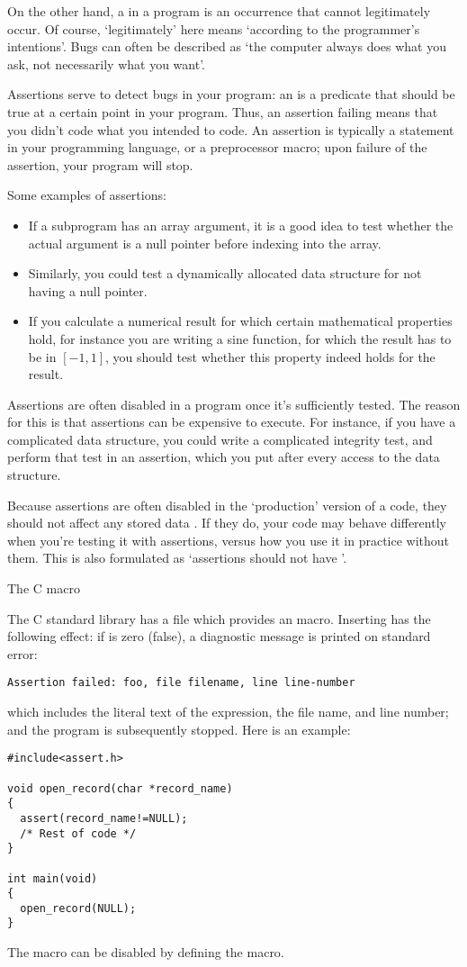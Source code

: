 On the other hand, a  in a program is an occurrence that cannot
legitimately occur. Of course, `legitimately' here means `according to
the programmer's intentions'. Bugs can often be described as `the computer
always does what you ask, not necessarily what you want'.

Assertions serve to detect bugs in your program: an 
is a predicate that should be true at a certain point in your program.
Thus, an assertion failing means that you didn't code what you intended to code.
An assertion is typically a statement in your programming language,
or a preprocessor macro; upon failure of the assertion, your program
will stop.

Some examples of assertions:
\begin{itemize}
\item If a subprogram has an array argument, it is a good idea to
  test whether the actual argument is a null pointer before indexing
  into the array.
\item Similarly, you could test a dynamically allocated data structure
  for not having a null pointer.
\item If you calculate a numerical result for which certain
  mathematical properties hold, for instance you are writing a sine function, for
  which the result has to be in $[-1,1]$, you should test whether this
  property indeed holds for the result.
\end{itemize}

Assertions are often disabled in a program once it's sufficiently tested.
The reason for this is that assertions can be expensive to execute.
For instance, 
if you have a complicated data structure, you could write a complicated
integrity test, and perform that test in an assertion, which you put
after every access to the data structure.

Because assertions are often disabled in the `production' version of a code,
they should not affect any stored data . If they do, your code may
behave differently when you're testing it with assertions, versus how you
use it in practice without them. This is also formulated as `assertions
should not have '.


 {The C \protect{} macro}

The C standard library has a file  which provides an
 macro. Inserting  has the following
effect: if  is zero (false), a diagnostic message is printed
on standard error:
\begin{verbatim}
Assertion failed: foo, file filename, line line-number
\end{verbatim}
which includes the literal text of the expression, 
the file name, and line number; and the program is subsequently stopped.
Here is an example:
\begin{verbatim}
#include<assert.h>

void open_record(char *record_name)
{
  assert(record_name!=NULL);
  /* Rest of code */
}

int main(void)
{
  open_record(NULL);
}
\end{verbatim}
The  macro can be disabled by defining the
 macro.

